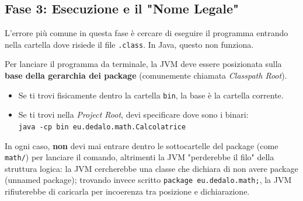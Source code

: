 \subsection*{Fase 3: Esecuzione e il "Nome Legale"}
L'errore più comune in questa fase è cercare di eseguire il programma entrando nella cartella dove risiede il file \texttt{.class}. In Java, questo non funziona.

Per lanciare il programma da terminale, la JVM deve essere posizionata sulla \textbf{base della gerarchia dei package} (comunemente chiamata \textit{Classpath Root}).

\begin{itemize}
    \item Se ti trovi fisicamente dentro la cartella \texttt{bin}, la base è la cartella corrente.
    \item Se ti trovi nella \textit{Project Root}, devi specificare dove sono i binari: \\ \texttt{java -cp bin eu.dedalo.math.Calcolatrice}
\end{itemize}

In ogni caso, \textbf{non} devi mai entrare dentro le sottocartelle del package (come \texttt{math/}) per lanciare il comando, altrimenti la JVM "perderebbe il filo" della struttura logica: la JVM cercherebbe una classe che dichiara di non avere package (unnamed package); trovando invece scritto \texttt{package eu.dedalo.math;}, la JVM rifiuterebbe di caricarla per incoerenza tra posizione e dichiarazione.


